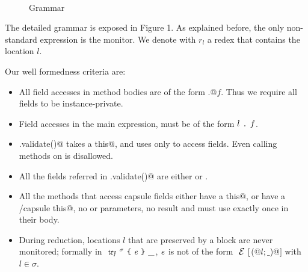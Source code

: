 \begin{figure}
\begin{grammatica}
\\
\\
\\
\\
\\
\\
\end{grammatica}
\caption{Grammar}
\end{figure}

The detailed grammar is exposed in Figure 1.
As explained before, the only non-standard expression is the monitor.
We denote with $r_l$ a redex that contains the location $l$.

\noindent Our well formedness criteria are:
\begin{itemize}
\item All field accesses in method bodies are of the form
\Q@this.@$f$. Thus we require all fields to be instance-private.

\item Field accesses in the main expression, 
must be of the form $l{ \mbox{ {\texttt{.}} } }\mathit{f}$.

\item \Q@.validate()@ takes a \Q@read this@, and uses \Q@this@ only to access fields. Even calling methods on \Q@this@
is disallowed.
\item All the fields referred in \Q@.validate()@ are either \Q@imm@ or \Q@capsule@.
\item All the methods that access capsule fields 
either have a \Q@read this@,
or have a \Q@mut/capsule this@, no \Q@mut@ or \Q@read@ parameters, no \Q@mut@ result and 
must use \Q@this@ exactly once in their body.
\item 
During reduction, locations $l$ that are preserved by a \Q@try@ block are
never monitored; formally 
in $\Kw{try}^\sigma\oC\e\cC\_$, ${\mathit{e}}$ is not of the form $\ctx[$\Q@M(@$l;\_$\Q@)@$]$ with $l\in\sigma$.
\end{itemize}

